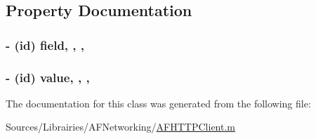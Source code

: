 \subsection{Property Documentation}
\hypertarget{interface_a_f_query_string_pair_a56a6a5052194b3fd862dc7eed618a646}{
\subsubsection[{field}]{\setlength{\rightskip}{0pt plus 5cm}-\/ (id) field\hspace{0.3cm}{\ttfamily [read]}, {\ttfamily [write]}, {\ttfamily [nonatomic]}, {\ttfamily [strong]}}}\label{interface_a_f_query_string_pair_a56a6a5052194b3fd862dc7eed618a646}
\hypertarget{interface_a_f_query_string_pair_a8aafaee91dab273d51a9448bfb4e7676}{
\subsubsection[{value}]{\setlength{\rightskip}{0pt plus 5cm}-\/ (id) value\hspace{0.3cm}{\ttfamily [read]}, {\ttfamily [write]}, {\ttfamily [nonatomic]}, {\ttfamily [strong]}}}\label{interface_a_f_query_string_pair_a8aafaee91dab273d51a9448bfb4e7676}


The documentation for this class was generated from the following file\-:\begin{DoxyCompactItemize}
\item 
Sources/\-Librairies/\-A\-F\-Networking/\hyperlink{_a_f_h_t_t_p_client_8m}{A\-F\-H\-T\-T\-P\-Client.\-m}\end{DoxyCompactItemize}
